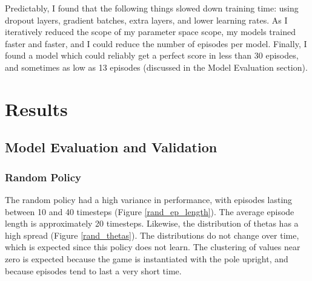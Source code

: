 \documentclass[12pt,a4paper]{article}
\begin{document}
Predictably, I found that the following things slowed down training time: using dropout layers, gradient batches, extra layers, and lower learning rates. As I iteratively reduced the scope of my parameter space scope, my models trained faster and faster, and I could reduce the number of episodes per model. Finally, I found a model which could reliably get a perfect score in less than 30 episodes, and sometimes as low as 13 episodes (discussed in the Model Evaluation section).



\section{Results}
%
\subsection*{Model Evaluation and Validation}

\subsubsection*{Random Policy}

The random policy had a high variance in performance, with episodes lasting between 10 and 40 timesteps (Figure \ref{rand_ep_length}).  The average episode length is approximately 20 timesteps. Likewise, the distribution of thetas has a high spread (Figure \ref{rand_thetas}). The distributions do not change over time, which is expected since this policy does not learn. The clustering of values near zero is expected because the game is instantiated with the pole upright, and because episodes tend to last a very short time.
\end{document}
